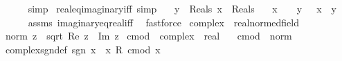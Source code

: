 \begin{isabellebody}
\ \ \ \ \isamarkupfalse%
\ simp%
\endisatagproof
{\isafoldproof}%
%
\isadelimproof
\isanewline
%
\endisadelimproof
\isanewline
{}\isamarkupfalse%
\ real{\isacharunderscore}{\kern0pt}eq{\isacharunderscore}{\kern0pt}imaginary{\isacharunderscore}{\kern0pt}iff\ {\isacharbrackleft}{\kern0pt}simp{\isacharbrackright}{\kern0pt}{\isacharcolon}{\kern0pt}\isanewline
\ \ \ {\isachardoublequoteopen}y\ {\isasymin}\ Reals{\isachardoublequoteclose}\ {\isachardoublequoteopen}x\ {\isasymin}\ Reals{\isachardoublequoteclose}\isanewline
\ \ \ {\isachardoublequoteopen}x\ {\isacharequal}{\kern0pt}\ {\isasymi}\ {\isacharasterisk}{\kern0pt}\ y\ \ {\isasymlongleftrightarrow}\ x{\isacharequal}{\kern0pt}{}\ {\isasymand}\ y{\isacharequal}{\kern0pt}{}{\isachardoublequoteclose}\isanewline
%
\isadelimproof
\ \ \ \ %
\endisadelimproof
%
\isatagproof
{}\isamarkupfalse%
\ assms\ imaginary{\isacharunderscore}{\kern0pt}eq{\isacharunderscore}{\kern0pt}real{\isacharunderscore}{\kern0pt}iff\ \isamarkupfalse%
\ fastforce%
\endisatagproof
{\isafoldproof}%
%
\isadelimproof
%
\endisadelimproof
%
\isadelimdocument
%
\endisadelimdocument
%
\isatagdocument
%
\isamarkuptrue%
%
\endisatagdocument
{\isafolddocument}%
%
\isadelimdocument
%
\endisadelimdocument
{}\isamarkupfalse%
\ complex\ {\isacharcolon}{\kern0pt}{\isacharcolon}{\kern0pt}\ real{\isacharunderscore}{\kern0pt}normed{\isacharunderscore}{\kern0pt}field\isanewline
{}\isanewline
\isanewline
{}\isamarkupfalse%
\ {\isachardoublequoteopen}norm\ z\ {\isacharequal}{\kern0pt}\ sqrt\ {\isacharparenleft}{\kern0pt}{\isacharparenleft}{\kern0pt}Re\ z{\isacharparenright}{\kern0pt}\ {\isacharplus}{\kern0pt}\ {\isacharparenleft}{\kern0pt}Im\ z{\isacharparenright}{\kern0pt}\isanewline
\isanewline
{}\isamarkupfalse%
\ cmod\ {\isacharcolon}{\kern0pt}{\isacharcolon}{\kern0pt}\ {\isachardoublequoteopen}complex\ {\isasymRightarrow}\ real{\isachardoublequoteclose}\isanewline
\ \ \ {\isachardoublequoteopen}cmod\ {\isasymequiv}\ norm{\isachardoublequoteclose}\isanewline
\isanewline
{}\isamarkupfalse%
\ complex{\isacharunderscore}{\kern0pt}sgn{\isacharunderscore}{\kern0pt}def{\isacharcolon}{\kern0pt}\ {\isachardoublequoteopen}sgn\ x\ {\isacharequal}{\kern0pt}\ x\ {\isacharslash}{\kern0pt}\isactrlsub R\ cmod\ x{\isachardoublequoteclose}\isanewline

\end{isabellebody}
